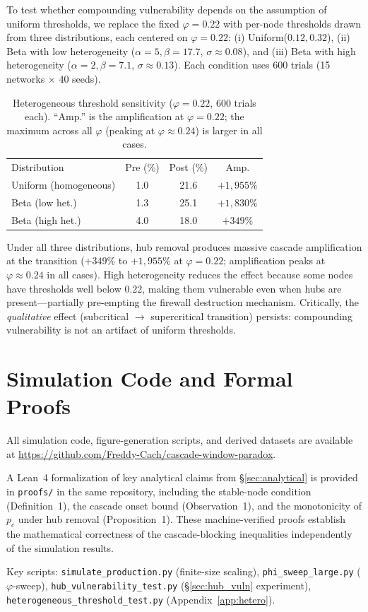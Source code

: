 \documentclass[aps,pre,twocolumn,superscriptaddress,showpacs]{revtex4-2}
\newcommand{\pc}{p_c}
\begin{document}
To test whether compounding vulnerability depends on the assumption of uniform thresholds, we replace the fixed $\varphi=0.22$ with per-node thresholds drawn from three distributions, each centered on $\varphi=0.22$: (i) Uniform($0.12, 0.32$), (ii) Beta with low heterogeneity ($\alpha=5, \beta=17.7$, $\sigma \approx 0.08$), and (iii) Beta with high heterogeneity ($\alpha=2, \beta=7.1$, $\sigma \approx 0.13$). Each condition uses 600 trials (15 networks $\times$ 40 seeds).

\begin{table}[h]
\caption{Heterogeneous threshold sensitivity ($\varphi=0.22$, 600 trials each). ``Amp.'' is the amplification at $\varphi=0.22$; the maximum across all $\varphi$ (peaking at $\varphi \approx 0.24$) is larger in all cases.}
\label{tab:hetero}
\begin{ruledtabular}
\begin{tabular}{lccc}
\textrm{Distribution} & \textrm{Pre (\%)} & \textrm{Post (\%)} & \textrm{Amp.} \\
\colrule
Uniform (homogeneous) & 1.0 & 21.6 & $+1{,}955\%$ \\
Beta (low het.) & 1.3 & 25.1 & $+1{,}830\%$ \\
Beta (high het.) & 4.0 & 18.0 & $+349\%$ \\
\end{tabular}
\end{ruledtabular}
\end{table}

Under all three distributions, hub removal produces massive cascade amplification at the transition ($+349\%$ to $+1{,}955\%$ at $\varphi=0.22$; amplification peaks at $\varphi \approx 0.24$ in all cases). High heterogeneity reduces the effect because some nodes have thresholds well below 0.22, making them vulnerable even when hubs are present---partially pre-empting the firewall destruction mechanism. Critically, the \emph{qualitative} effect (subcritical $\to$ supercritical transition) persists: compounding vulnerability is not an artifact of uniform thresholds.

\section{Simulation Code and Formal Proofs}
\label{app:code}

All simulation code, figure-generation scripts, and derived datasets are available at \url{https://github.com/Freddy-Cach/cascade-window-paradox}.

A Lean~4 formalization of key analytical claims from \S\ref{sec:analytical} is provided in \texttt{proofs/} in the same repository, including the stable-node condition (Definition~1), the cascade onset bound (Observation~1), and the monotonicity of $\pc$ under hub removal (Proposition~1). These machine-verified proofs establish the mathematical correctness of the cascade-blocking inequalities independently of the simulation results.

Key scripts: \texttt{simulate\_production.py} (finite-size scaling), \texttt{phi\_sweep\_large.py} ($\varphi$-sweep), \texttt{hub\_vulnerability\_test.py} (\S\ref{sec:hub_vuln} experiment), \texttt{heterogeneous\_threshold\_test.py} (Appendix~\ref{app:hetero}).
\end{document}
